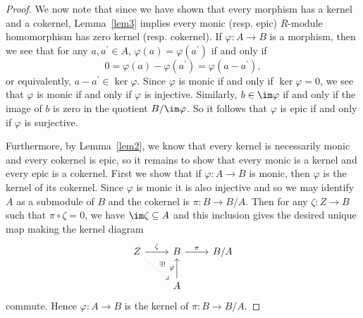 \documentclass[10pt]{amsart}
\begin{document}
\begin{ex}
\begin{proof}
    We now note that since we have shown that every morphism has a kernel and a cokernel, Lemma~\ref{lem3} implies every monic (resp. epic) $R$-module homomorphism has zero kernel (resp. cokernel).
    If $\varphi : A \rightarrow B$ is a morphism, then we see that for any $a, a^\prime \in A$, $\varphi(a) = \varphi(a^\prime)$ if and only if
    $$0 = \varphi(a) - \varphi(a^\prime) = \varphi(a - a^\prime),$$
    or equivalently, $a - a^\prime \in \ker\varphi$.
    Since $\varphi$ is monic if and only if $\ker\varphi = 0$, we see that $\varphi$ is monic if and only if $\varphi$ is injective.
    Similarly, $b \in \im\varphi$ if and only if the image of $b$ is zero in the quotient $B/\im\varphi$.
    So it follows that $\varphi$ is epic if and only if $\varphi$ is surjective.

    Furthermore, by Lemma~\ref{lem2}, we know that every kernel is necessarily monic and every cokernel is epic, so it remains to show that every monic is a kernel and every epic is a cokernel.
    First we show that if $\varphi : A \rightarrow B$ is monic, then $\varphi$ is the kernel of its cokernel.
    Since $\varphi$ is monic it is also injective and so we may identify $A$ as a submodule of $B$ and the cokernel is $\pi : B \rightarrow B/A$.
    Then for any $\zeta : Z \rightarrow B$ such that $\pi \circ \zeta = 0$, we have $\im\zeta \subseteq A$ and this inclusion gives the desired unique map making the kernel diagram
    $$\begin{tikzcd}
      Z \arrow{r}{\zeta}\arrow[dotted]{rd}{\exists !} &B\arrow{r}{\pi} & B/A\\
      & A\arrow{u}{\varphi}
    \end{tikzcd}$$
    commute.
    Hence $\varphi : A \rightarrow B$ is the kernel of $\pi : B \rightarrow B/A$.


\end{proof}
\end{ex}
\end{document}
